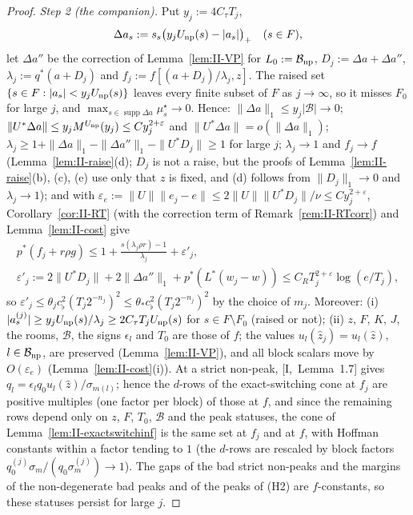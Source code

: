\documentclass[10pt]{amsart}
\theoremstyle{definition}
\theoremstyle{remark}
\newcommand{\supp}{\operatorname{supp}}
\newcommand{\zh}{\hat z}
\begin{document}
\begin{proof}
\emph{Step 2 (the companion).}  Put $y_j:=4C_\tau T_j$,
\[
 \Delta a_s:=s_s\big(y_jU_{\rm np}(s)-|a_s|\big)_+\quad(s\in F),
\]
let $\Delta a''$ be the correction of Lemma~\ref{lem:II-VP} for
$L_0:=\mathcal B_{\rm np}$, $D_j:=\Delta a+\Delta a''$, $\lambda_j:=q^*(a+D_j)$
and $f_j:=f[(a+D_j)/\lambda_j,z]$.  The raised set $\{s\in F:|a_s|<y_j
U_{\rm np}(s)\}$ leaves every finite subset of $F$ as $j\to\infty$, so it
misses $F_0$ for large $j$, and $\max_{s\in\supp\Delta a}\mu^\star_s\to0$.
Hence: $\|\Delta a\|_1\le y_j|\mathcal B|\to0$; $\|U^*\Delta a\|\le y_jM^{U_{\rm
np}}(y_j)\le Cy_j^{2+\varepsilon}$ and $\|U^*\Delta a\|=o(\|\Delta a\|_1)$;
$\lambda_j\ge1+\|\Delta a\|_1-\|\Delta a''\|_1-\|U^*D_j\|\ge1$ for large $j$;
$\lambda_j\to1$ and $f_j\to f$ (Lemma~\ref{lem:II-raise}(d); $D_j$ is not a
raise, but the proofs of Lemma~\ref{lem:II-raise}(b), (c), (e) use only that
$z$ is fixed, and (d) follows from $\|D_j\|_1\to0$ and $\lambda_j\to1$); and with
$\varepsilon_e:=\|U\|\|e_j-e\|\le2\|U\|\|U^*D_j\|/\nu\le Cy_j^{2+\varepsilon}$,
Corollary~\ref{cor:II-RT} (with the correction term of
Remark~\ref{rem:II-RTcorr}) and Lemma~\ref{lem:II-cost} give
\begin{gather*}
 p^*(f_j+r\rho g)\le1+\frac{s(\lambda_j\rho r)-1}{\lambda_j}+\varepsilon'_j,\\
 \varepsilon'_j:=2\|U^*D_j\|+2\|\Delta a''\|_1+p^*(L^*(w_j-w))\le C_R
 T_j^{2+\varepsilon}\log(e/T_j),
\end{gather*}
so $\varepsilon'_j\le\theta_jc_\flat^2(T_j2^{-n_j})^2\le\theta_*c_\flat^2
(T_j2^{-n_j})^2$ by the choice of $m_j$.
Moreover: (i) $|a^{(j)}_s|\ge y_jU_{\rm np}(s)/\lambda_j\ge2C_\tau T_jU_{\rm
np}(s)$ for $s\in F\setminus F_0$ (raised or not); (ii) $z$, $F$, $K$, $J$,
the rooms, $\mathcal B$, the signs $\epsilon_l$ and $T_0$ are those of $f$;
the values $u_l(\zh_j)=u_l(\zh)$, $l\in\mathcal B_{\rm np}$, are preserved
(Lemma~\ref{lem:II-VP}), and all block scalars move by $O(\varepsilon_e)$
(Lemma~\ref{lem:II-cost}(i)).  At a strict non-peak, [I,~Lemma~1.7] gives
$q_l=\epsilon_lq_0u_l(\zh)/\sigma_{m(l)}$; hence the $d$-rows of the
exact-switching cone at $f_j$ are positive multiples (one factor per block)
of those at $f$, and since the remaining rows depend only on $z$, $F$, $T_0$,
$\mathcal B$ and the peak statuses, the cone of
Lemma~\ref{lem:II-exactswitchinf} is the same set at $f_j$ and at $f$, with
Hoffman constants within a factor tending to $1$ (the $d$-rows are rescaled
by block factors $q^{(j)}_0\sigma_m/(q_0\sigma^{(j)}_m)\to1$).  The gaps of the bad strict non-peaks and the
margins of the non-degenerate bad peaks and of the peaks of (H2) are
$f$-constants, so these statuses persist for large $j$.


\end{proof}
\end{document}
